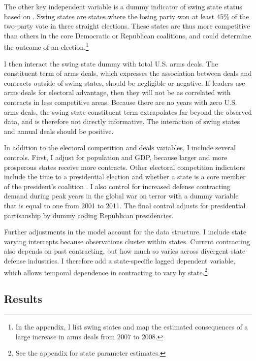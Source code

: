 \documentclass[12pt]{article}
\begin{document}
The other key independent variable is a dummy indicator of swing state status based on \citet{KrinerReeves2015}.
Swing states are states where the losing party won at least 45\% of the two-party vote in three straight elections.
These states are thus more competitive than others in the core Democratic or Republican coalitions, and could determine the outcome of an election.\footnote{In the appendix, I list swing states and map the estimated consequences of a large increase in arms deals from 2007 to 2008.}
%
%
%


I then interact the swing state dummy with total U.S. arms deals. 
The constituent term of arms deals, which expresses the association between deals and contracts outside of swing states, should be negligible or negative.
If leaders use arms deals for electoral advantage, then they will not be as correlated with contracts in less competitive areas. 
Because there are no years with zero U.S. arms deals, the swing state constituent term extrapolates far beyond the observed data, and is therefore not directly informative. 
The interaction of swing states and annual deals should be positive.


In addition to the electoral competition and deals variables, I include several controls. 
First, I adjust for population and GDP, because larger and more prosperous states receive more contracts. 
Other electoral competition indicators include the time to a presidential election and whether a state is a core member of the president's coalition \citep{KrinerReeves2015}. 
I also control for increased defense contracting demand during peak years in the global war on terror with a dummy variable that is equal to one from 2001 to 2011. 
The final control adjusts for presidential partisanship by dummy coding Republican presidencies. 


Further adjustments in the model account for the data structure.
I include state varying intercepts because observations cluster within states. 
Current contracting also depends on past contracting, but how much so varies across divergent state defense industries. 
I therefore add a state-specific lagged dependent variable, which allows temporal dependence in contracting to vary by state.\footnote{See the appendix for state parameter estimates.}


\subsection{Results}
\end{document}
